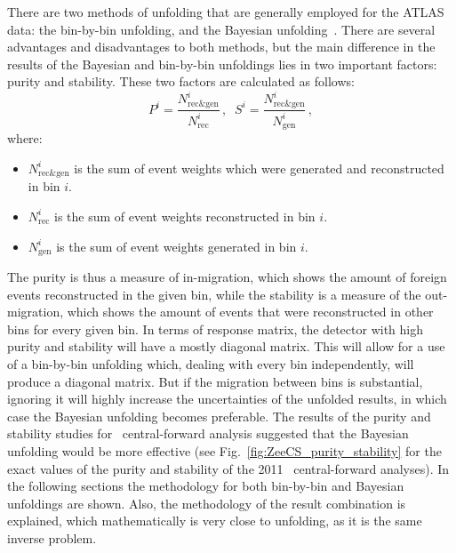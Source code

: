 There are two methods of unfolding that are generally employed for the ATLAS data: the bin-by-bin unfolding, and the Bayesian unfolding~\cite{lib:zcs_unfolding}. There are several advantages and disadvantages to both methods, but the main difference in the results of the Bayesian and bin-by-bin unfoldings lies in two important factors: purity and stability. These two factors are calculated as follows:
\begin{equation}
P^{i} = \frac{N^{i}_{\text{rec\&gen}} }{ N^{i}_{\text{rec}} }\,, \; \;
S^{i} = \frac{N^{i}_{\text{rec\&gen}} }{ N^{i}_{\text{gen}} }\,,
\end{equation}
where:
\begin{itemize}
\item {\bfseries $N^i_{\text{rec\&gen}}$} is the sum of event weights which were generated and reconstructed in bin $i$.
\item {\bfseries $N^i_{\text{rec}}$} is the sum of event weights reconstructed in bin $i$.
\item {\bfseries $N^i_{\text{gen}}$} is the sum of event weights generated in bin $i$.
\end{itemize}

The purity is thus a measure of in-migration, which shows the amount of foreign events reconstructed in the given bin, while the stability is a measure of the out-migration, which shows the amount of events that were reconstructed in other bins for every given bin. In terms of response matrix, the detector with high purity and stability will have a mostly diagonal matrix. This will allow for a use of a bin-by-bin unfolding which, dealing with every bin independently, will produce a diagonal matrix. But if the migration between bins is substantial, ignoring it will highly increase the uncertainties of the unfolded results, in which case the Bayesian unfolding becomes preferable. The results of the purity and stability studies for \Zee\ central-forward analysis suggested that the Bayesian unfolding would be more effective (see Fig.~\ref{fig:ZeeCS_purity_stability} for the exact values of the purity and stability of the 2011 \Zee\ central-forward analyses). In the following sections the methodology for both bin-by-bin and Bayesian unfoldings are shown. Also, the methodology of the result combination is explained, which mathematically is very close to unfolding, as it is the same inverse problem.


